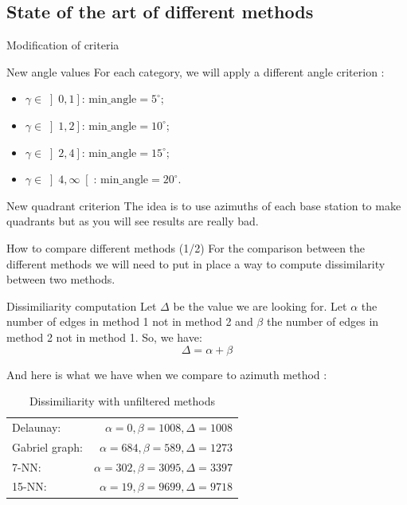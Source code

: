 \subsection{State of the art of different methods}
\insertsubsectionframe

\begin{frame}{Modification of criteria}
    \begin{block}{New angle values}
        For each category, we will apply a different angle criterion :
        \begin{itemize}
            \item $\gamma\in\left]0, 1\right]$: $\text{min\_angle}=5^\circ$;
            \item $\gamma\in\left]1, 2\right]$: $\text{min\_angle}=10^\circ$;
            \item $\gamma\in\left]2, 4\right]$: $\text{min\_angle}=15^\circ$;
            \item $\gamma\in\left]4, \infty\right[$: $\text{min\_angle}=20^\circ$.
        \end{itemize}
    \end{block}

    \begin{block}{New quadrant criterion}
        The idea is to use azimuths of each base station to make quadrants but as you will see results are really bad.
    \end{block}
\end{frame}

\begin{frame}{How to compare different methods (1/2)}
    For the comparison between the different methods we will need to put in place a way to compute dissimilarity between two methods.
    \begin{block}{Dissimiliarity computation}
        Let $\Delta$ be the value we are looking for. Let $\alpha$ the number of edges in method 1 not in method 2 and $\beta$ the number of edges in method 2 not in method 1. So, we have:
        $$
            \Delta = \alpha + \beta
        $$
    \end{block}
    And here is what we have when we compare to azimuth method :
    \begin{table}[!ht]
        \small
        \centering
        \begin{tabular}{lr}
            Delaunay: & $\alpha = 0, \beta = 1008, \Delta = 1008$\\
            Gabriel graph: & $\alpha = 684, \beta = 589, \Delta = 1273$\\
            7-NN: & $\alpha = 302, \beta = 3095, \Delta = 3397$\\
            15-NN: & $\alpha = 19, \beta = 9699, \Delta = 9718$\\
        \end{tabular}
        \caption{Dissimiliarity with unfiltered methods}
    \end{table}
\end{frame}

